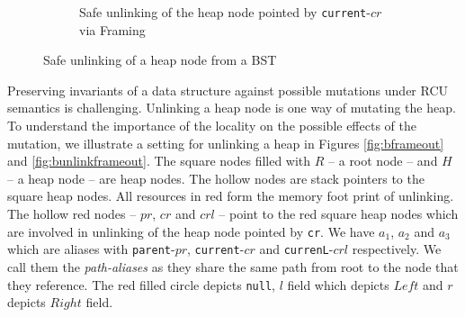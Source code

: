 \begin{figure}[H]
\begin{subfigure}[b]{.4\linewidth}

 \caption{Safe unlinking of the heap node pointed by \texttt{current}-$cr$ via \textsf{Framing}}
 \label{fig:apbunlinkframeout}
\end{subfigure}
\caption{Safe unlinking of a heap node from a \textsf{BST}}
 \label{fig:apunlkappndx}\vspace{-2mm}
 \end{figure}

Preserving invariants of a data structure against possible mutations under \textsf{RCU} semantics is challenging. Unlinking a heap node is one way of mutating the heap. To understand the importance of the locality on the possible effects of the mutation, we illustrate a setting for unlinking a heap in Figures  \ref{fig:bframeout} and \ref{fig:bunlinkframeout}. The square nodes filled with $R$ -- a root node -- and $H$ -- a heap node -- are heap nodes. The hollow nodes are stack pointers to the square heap nodes. All resources in red form the memory foot print of unlinking. The hollow red nodes -- $pr$, $cr$ and $crl$ -- point to the red square heap nodes which are involved in unlinking of the heap node pointed by \texttt{cr}. We have $a_1$, $a_2$ and $a_3$ which are aliases with \texttt{parent}-$pr$, \texttt{current}-$cr$ and \texttt{currenL}-$crl$ respectively. We call them the \textit{path-aliases} as they share the same path from root to the node that they reference. The red filled circle depicts \texttt{null}, $l$ field which depicts $Left$ and $r$ depicts $Right$ field.

